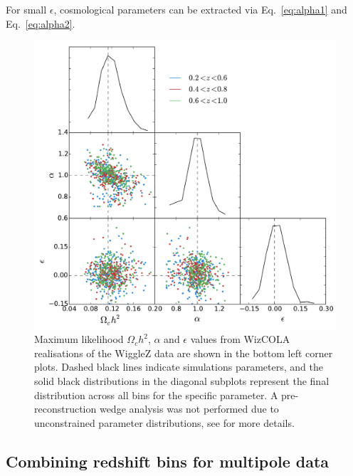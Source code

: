 \documentclass[iop,twocolappendix]{emulateapj}
\begin{document}
For small $\epsilon$, cosmological parameters can be extracted via Eq.~\ref{eq:alpha1} and Eq.~\ref{eq:alpha2}.

\begin{figure}[h!]
	\begin{center}
		\includegraphics[width=\columnwidth]{images/mpDist2.pdf}
	\end{center}
	\caption{Maximum likelihood $\Omega_c h^2$, $\alpha$ and $\epsilon$ values from WizCOLA realisations of the WiggleZ data are shown in the bottom left corner plots. Dashed black lines indicate simulations parameters, and the solid black distributions in the diagonal subplots represent the final distribution across all bins for the specific parameter. A pre-reconstruction wedge analysis was not performed due to unconstrained parameter distributions, see \citet[\S 4.3]{HintonThesis2015} for more details.}
	\label{fig:mpDist2}
\end{figure}



\subsection{Combining redshift bins for multipole data}
\end{document}
